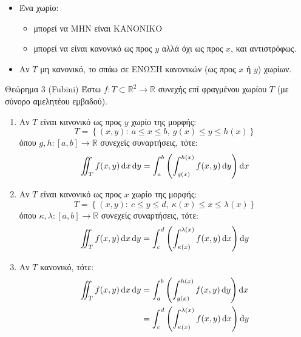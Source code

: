 \documentclass[11pt,a4paper,titlepage,draft]{article}
\newcommand{\textlatin}[1]{#1}
\begin{document}
\begin{itemize}
\item Ένα χωρίο:
\begin{itemize}
\item μπορεί να ΜΗΝ είναι ΚΑΝΟΝΙΚΟ
\item μπορεί να είναι κανονικό ως προς \(y\) αλλά όχι ως προς \(x\), και αντιστρόφως.
\end{itemize}
\item Αν \(T\) μη κανονικό, το σπάω σε ΕΝΩΣΗ κανονικών (ως προς \(x\) ή $y$) χωρίων.
\end{itemize}

\begin{attnbox}{Θεώρημα 3 (\textlatin{Fubini})}
Έστω \(f: T \subset  \mathbb R ^2 \to  \mathbb R \) συνεχής επί φραγμένου χωρίου \(T\) (με σύνορο αμελητέου εμβαδού).
\begin{enumerate}
\item Αν \(T\) είναι κανονικό ως προς \(y\) χωρίο της μορφής:
\[
T =  \left\lbrace (x,y):\ a \leq x \leq b, \ g(x) \leq y \leq h(x)  \right\rbrace
\]
όπου \(g,h: [a,b] \to  \mathbb R \) συνεχείς συναρτήσεις, τότε:
\[
\iint_T f(x,y) \dif x \dif y =
\int_a^b \left(
\int_{g(x)}^{h(x)} f(x,y) \dif y
\right) \dif x
\]
\item Αν \(T\) είναι κανονικό ως προς \(x\) χωρίο της μορφής:
\[
T =  \left\lbrace (x,y):\ c \leq y \leq d, \ \kappa (x) \leq x \leq \lambda(x)  \right\rbrace
\]
όπου \(\kappa,\lambda: [a,b] \to  \mathbb R \) συνεχείς συναρτήσεις, τότε:
\[
\iint_T f(x,y) \dif x \dif y =
\int_c^d \left(
\int_{\kappa(x)}^{\lambda(x)} f(x,y) \dif x
\right) \dif y
\]
\item Αν \(T\) κανονικό, τότε:
\begin{align*}
\iint_T f(x,y)\dif x \dif y
&=
\int_a^b \left(
\int_{g(x)}^{h(x)} f(x,y) \dif y
\right) \dif x \\
&=
\int_c^d \left(
\int_{\kappa(x)}^{\lambda(x)} f(x,y) \dif x
\right) \dif y
\end{align*}
\end{enumerate}
\end{attnbox}
\end{document}
